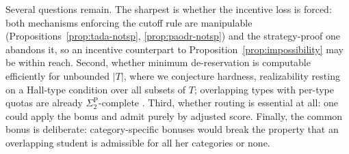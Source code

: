\documentclass[a4paper,twoside]{article}
\theoremstyle{definition}
\begin{document}


Several questions remain. The sharpest is whether the incentive loss is forced: both mechanisms enforcing the cutoff rule are manipulable (Propositions~\ref{prop:tada-notsp}, \ref{prop:paodr-notsp}) and the strategy-proof one abandons it, so an incentive counterpart to Proposition~\ref{prop:impossibility} may be within reach. Second, whether minimum de-reservation is computable efficiently for unbounded $|T|$, where we conjecture hardness, realizability resting on a Hall-type condition over all subsets of $T$; overlapping types with per-type quotas are already $\Sigma_2^{\mathrm{P}}$-complete \cite{CGH20a}. Third, whether routing is essential at all: one could apply the bonus and admit purely by adjusted score. Finally, the common bonus is deliberate: category-specific bonuses would break the property that an overlapping student is admissible for all her categories or none.

\end{document}

